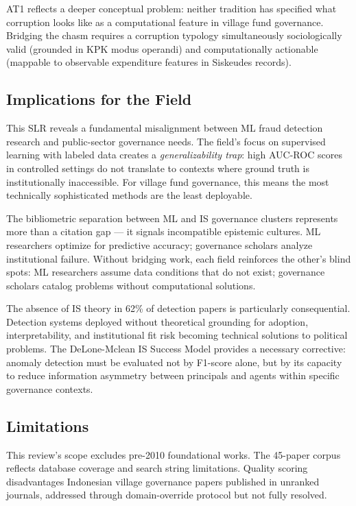 \documentclass[3p,times,procedia]{elsarticle}
\begin{document}
AT1 reflects a deeper conceptual problem: neither tradition has specified what corruption looks like as a computational feature in village fund governance. Bridging the chasm requires a corruption typology simultaneously sociologically valid (grounded in KPK modus operandi) and computationally actionable (mappable to observable expenditure features in Siskeudes records).

\subsection{Implications for the Field}

This SLR reveals a fundamental misalignment between ML fraud detection research and public-sector governance needs. The field's focus on supervised learning with labeled data creates a \textit{generalizability trap}: high AUC-ROC scores in controlled settings do not translate to contexts where ground truth is institutionally inaccessible. For village fund governance, this means the most technically sophisticated methods are the least deployable.

The bibliometric separation between ML and IS governance clusters represents more than a citation gap --- it signals incompatible epistemic cultures. ML researchers optimize for predictive accuracy; governance scholars analyze institutional failure. Without bridging work, each field reinforces the other's blind spots: ML researchers assume data conditions that do not exist; governance scholars catalog problems without computational solutions.

The absence of IS theory in 62\% of detection papers is particularly consequential. Detection systems deployed without theoretical grounding for adoption, interpretability, and institutional fit risk becoming technical solutions to political problems. The DeLone-Mclean IS Success Model provides a necessary corrective: anomaly detection must be evaluated not by F1-score alone, but by its capacity to reduce information asymmetry between principals and agents within specific governance contexts.

\subsection{Limitations}

This review's scope excludes pre-2010 foundational works. The 45-paper corpus reflects database coverage and search string limitations. Quality scoring disadvantages Indonesian village governance papers published in unranked journals, addressed through domain-override protocol but not fully resolved.
\end{document}
